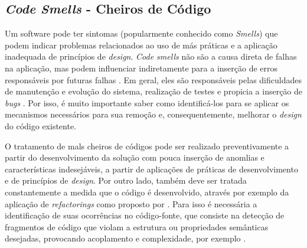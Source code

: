 


\subsection{\emph{Code Smells} - Cheiros de Código}
\label{sec-bad-smells}

Um software pode ter sintomas (popularmente conhecido como \emph{Smells}) que podem indicar problemas relacionados ao uso de más práticas e a aplicação inadequada de princípios de \emph{design}. \emph{Code smells} não são a causa direta de falhas na aplicação, mas podem influenciar indiretamente para a inserção de erros responsáveis por futuras falhas \cite{fowler1999}. Em geral, eles são responsáveis pelas dificuldades de manutenção e evolução do sistema, realização de testes e propicia a inserção de \emph{bugs} \cite{mansoor2014}. Por isso, é muito importante saber como identificá-los para se aplicar os mecanismos necessários para sua remoção e, consequentemente, melhorar o \emph{design} do código existente. 

%

O tratamento de mals cheiros de códigos pode ser realizado preventivamente a partir do desenvolvimento da solução com pouca inserção de anomlias e características indesejáveis, a partir de aplicações de práticas de desenvolvimento e de princípios de \emph{design}. Por outro lado, também deve ser tratada constantemente a medida que o código é desenvolvido, através por exemplo da aplicação de \emph{refactorings} como proposto por \cite{fowler1999}. Para isso é necessária a identificação de suas ocorrências no código-fonte, que consiste na detecção de fragmentos de código que violam a estrutura ou propriedades semânticas desejadas, provocando acoplamento e complexidade, por exemplo \cite{mansoor2014}.

